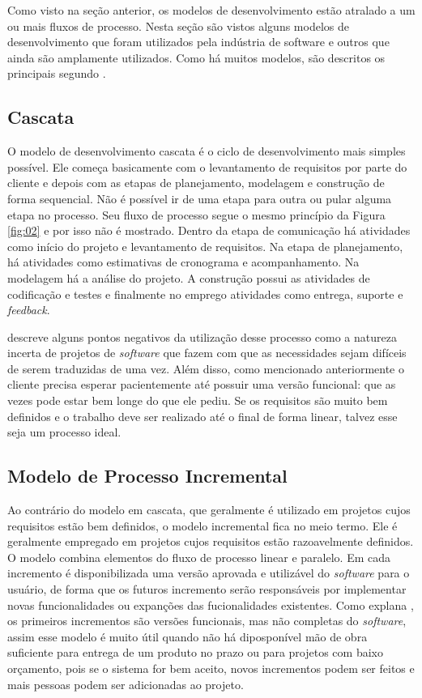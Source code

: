 Como visto na seção anterior, os modelos de desenvolvimento estão atralado a um ou mais fluxos de processo. Nesta seção são vistos alguns modelos de desenvolvimento que foram utilizados pela indústria de software e outros que ainda são amplamente utilizados. Como há muitos modelos, são descritos os principais segundo .

\subsection{Cascata}
\label{sec:cascata}

O modelo de desenvolvimento cascata é o ciclo de desenvolvimento mais simples possível. Ele começa basicamente com o levantamento de requisitos por parte do cliente e depois com as etapas de planejamento, modelagem e construção de forma sequencial. Não é possível ir de uma etapa para outra ou pular alguma etapa no processo. Seu fluxo de processo segue o mesmo princípio da Figura \ref{fig:02} e por isso não é mostrado. Dentro da etapa de comunicação há atividades como início do projeto e levantamento de requisitos. Na etapa de planejamento, há atividades como estimativas de cronograma e acompanhamento. Na modelagem há a análise do projeto. A construção possui as atividades de codificação e testes e finalmente no emprego atividades como entrega, suporte e \textit{feedback}.

 descreve alguns pontos negativos da utilização desse processo como a natureza incerta de projetos de \textit{software} que fazem com que as necessidades sejam difíceis de serem traduzidas de uma vez. Além disso, como mencionado anteriormente o cliente precisa esperar pacientemente até possuir uma versão funcional: que as vezes pode estar bem longe do que ele pediu. Se os requisitos são muito bem definidos e o trabalho deve ser realizado até o final de forma linear, talvez esse seja um processo ideal. 

\subsection{Modelo de Processo Incremental}

Ao contrário do modelo em cascata, que geralmente é utilizado em projetos cujos requisitos estão bem definidos, o modelo incremental fica no meio termo. Ele é geralmente empregado em projetos cujos requisitos estão razoavelmente definidos. O modelo combina elementos do fluxo de processo linear e paralelo. Em cada incremento é disponibilizada uma versão aprovada e utilizável do \textit{software} para o usuário, de forma que os futuros incremento serão responsáveis por implementar novas funcionalidades ou expanções das fucionalidades existentes. Como explana , os primeiros incrementos são versões funcionais, mas não completas do \textit{software}, assim esse modelo é muito útil quando não há diposponível mão de obra suficiente para entrega de um produto no prazo ou para projetos com baixo orçamento, pois se o sistema for bem aceito, novos incrementos podem ser feitos e mais pessoas podem ser adicionadas ao projeto.


